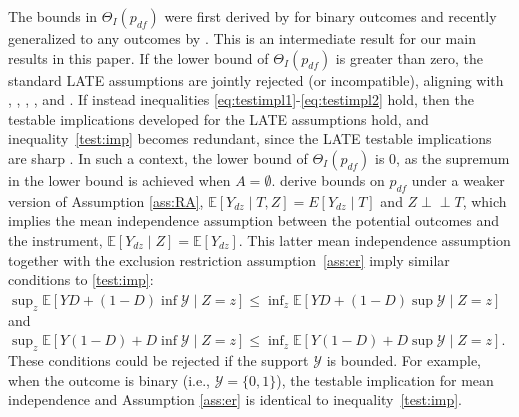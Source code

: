 \documentclass[12pt]{article}
\theoremstyle{plain}
\theoremstyle{definition}
\theoremstyle{remark}
\newcommand{\indep}{\perp \!\!\! \perp}
\begin{document}
The bounds in $\Theta_I(p_{df})$ were first derived by \cite{richardson2010analysis} for binary outcomes and recently generalized to any outcomes by \cite{Noack2021SensitivityAssumption}. This is an intermediate result for our main results in this paper.
If the lower bound of $\Theta_I(p_{df})$ is greater than zero, the standard LATE assumptions are jointly rejected (or incompatible), aligning with \cite{Balke1997BoundsCompliance}, \cite{imbens1997estimating}, \cite{Heckman2005StructuralEvaluation}, \cite{Kitagawa2015AValidity}, and \cite{Mourifie2017TestingAssumptions}. %
If instead inequalities \eqref{eq:testimpl1}-\eqref{eq:testimpl2} hold, then the testable implications developed for the LATE assumptions hold, and inequality~\eqref{test:imp} becomes redundant, since the LATE testable implications are sharp \citep{Kitagawa2015AValidity, Mourifie2017TestingAssumptions}. In such a context, the lower bound of $\Theta_I(p_{df})$ is 0, as the supremum in the lower bound is achieved when $A=\emptyset$. \cite{Huber2017SharpNoncompliance} derive bounds on $p_{df}$ under a weaker version of Assumption \ref{ass:RA}, $\mathbb E[Y_{dz}\mid T, Z]=E[Y_{dz}\mid T]$ and $Z \indep T$, which implies the \cite{Manski1990NonparametricEffects} mean independence assumption between the potential outcomes and the instrument, $\mathbb E[Y_{dz} \mid Z]=\mathbb E[Y_{dz}]$. This latter mean independence assumption together with the exclusion restriction assumption~\ref{ass:er} imply similar conditions to \eqref{test:imp}: $\sup_z \mathbb E[YD+(1-D)\inf \mathcal Y \mid Z=z] \leq \inf_z \mathbb E[YD+(1-D)\sup \mathcal Y \mid Z=z]$ and $\sup_z \mathbb E[Y(1-D)+D\inf \mathcal Y\mid Z=z] \leq \inf_z \mathbb E[Y(1-D)+D\sup \mathcal Y\mid Z=z]$. These conditions could be rejected if the support $\mathcal Y$ is bounded. For example, when the outcome is binary (i.e., $\mathcal Y=\{0,1\}$), the testable implication for mean independence and Assumption \ref{ass:er} is identical to inequality~\eqref{test:imp}.  
\end{document}
